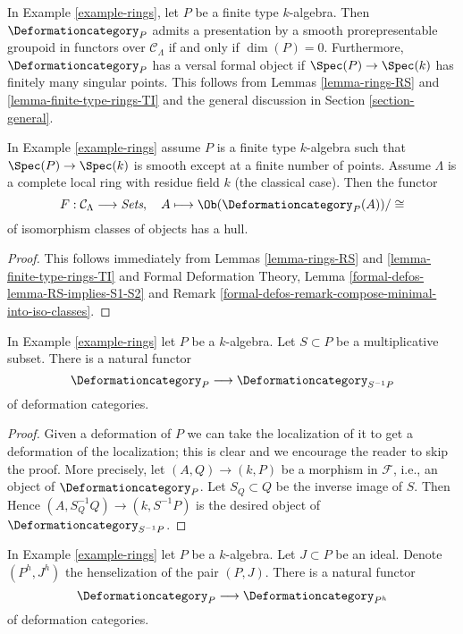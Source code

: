 \noindent
In Example \ref{example-rings}, let $P$ be a finite type
$k$-algebra. Then $\Deformationcategory_P$
admits a presentation by a smooth prorepresentable groupoid in functors
over $\mathcal{C}_\Lambda$ if and only if $\dim(P) = 0$.
Furthermore, $\Deformationcategory_P$ has a versal formal
object if $\Spec(P) \to \Spec(k)$ has finitely many
singular points. This follows from Lemmas \ref{lemma-rings-RS} and
\ref{lemma-finite-type-rings-TI}
and the general discussion in Section \ref{section-general}.

\begin{lemma}
\label{lemma-rings-hull}
In Example \ref{example-rings} assume $P$ is a finite type
$k$-algebra such that $\Spec(P) \to \Spec(k)$ is smooth except
at a finite number of points.
Assume $\Lambda$ is a complete local ring with residue field $k$
(the classical case). Then the functor
$$
F : \mathcal{C}_\Lambda \longrightarrow \textit{Sets},\quad
A \longmapsto \Ob(\Deformationcategory_P(A))/\cong
$$
of isomorphism classes of objects has a hull.
\end{lemma}

\begin{proof}
This follows immediately from Lemmas \ref{lemma-rings-RS} and
\ref{lemma-finite-type-rings-TI} and
Formal Deformation Theory, Lemma \ref{formal-defos-lemma-RS-implies-S1-S2}
and Remark \ref{formal-defos-remark-compose-minimal-into-iso-classes}.
\end{proof}

\begin{lemma}
\label{lemma-localization}
In Example \ref{example-rings} let $P$ be a $k$-algebra.
Let $S \subset P$ be a multiplicative subset. There is a natural functor
$$
\Deformationcategory_P \longrightarrow \Deformationcategory_{S^{-1}P}
$$
of deformation categories.
\end{lemma}

\begin{proof}
Given a deformation of $P$ we can take the localization
of it to get a deformation of the localization; this is
clear and we encourage the reader to skip the proof. More precisely,
let $(A, Q) \to (k, P)$ be a morphism in $\mathcal{F}$, i.e.,
an object of $\Deformationcategory_P$. Let $S_Q \subset Q$ be the
inverse image of $S$. Then
Hence $(A, S_Q^{-1}Q) \to (k, S^{-1}P)$
is the desired object of $\Deformationcategory_{S^{-1}P}$.
\end{proof}

\begin{lemma}
\label{lemma-henselization}
In Example \ref{example-rings} let $P$ be a $k$-algebra.
Let $J \subset P$ be an ideal.
Denote $(P^h, J^h)$ the henselization of the pair $(P, J)$.
There is a natural functor
$$
\Deformationcategory_P \longrightarrow \Deformationcategory_{P^h}
$$
of deformation categories.
\end{lemma}

